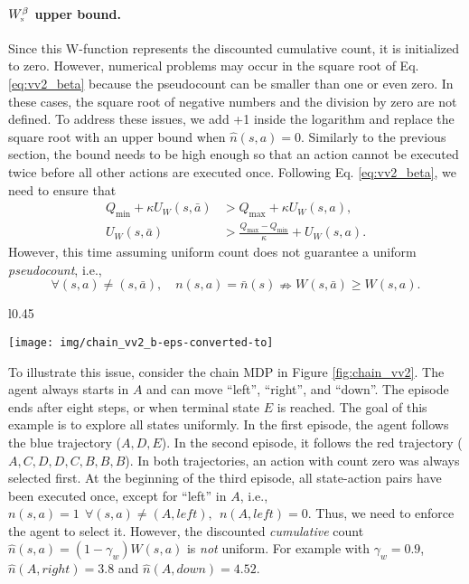 \documentclass{article}
\newcommand{\textsub}[1]{\textsc{\tiny #1}} \newcommand{\func}[2]{\textsf{#1}(#2)} \newcommand{\hl}[1]{\textcolor{red}{{#1}}} \newcommand{\hll}[1]{\textcolor{blue}{{#1}}}
\newcommand{\coeff}{\kappa}
\begin{document}
\paragraph{$W^\beta_{\textsub{n}}$ upper bound.}
Since this W-function represents the discounted cumulative count, it is initialized to zero. 
However, numerical problems may occur in the square root of Eq. \eqref{eq:vv2_beta} because the pseudocount can be smaller than one or even zero. In these cases, the square root of negative numbers and the division by zero are not defined.
To address these issues, we add +1 inside the logarithm and replace the square root with an upper bound when $\hat{n}(s,a) = 0$. Similarly to the previous section, the bound needs to be high enough so that an action cannot be executed twice before all other actions are executed once. Following Eq. \eqref{eq:vv2_beta}, we need to ensure that 
\begin{align}
Q_{\min} + \coeff U_W(s,\bar{a}) &> Q_{\max} + \coeff U_W(s,a), \nonumber
\\
U_W(s,\bar{a}) &> \frac{Q_{\max} - Q_{\min}}{\coeff} + U_W(s,a). \label{eq:vv2_condition}
\end{align}
However, this time assuming uniform count does not guarantee a uniform \textit{pseudocount}, i.e., 
\begin{equation}
\forall (s,a) \neq (s,\bar{a}), \quad n(s,a) = \bar{n}(s) \nRightarrow W(s,\bar{a}) \geq W(s,a).
\end{equation}

\begin{wrapfigure}{l}{0.45\textwidth}
	\begin{center}
		\vspace*{-0.7cm}
		\texttt{[image: img/chain\_vv2\_b-eps-converted-to]}
	\end{center}
	\vspace*{-0.3cm}
	\caption{\label{fig:chain_vv2}Chainworld with uniform count.}
	\vspace*{-0.3cm}
\end{wrapfigure}
To illustrate this issue, consider the chain MDP in Figure \ref{fig:chain_vv2}. The agent always starts in $A$ and can move ``left'', ``right'', and ``down''. The episode ends after eight steps, or when terminal state $E$ is reached. The goal of this example is to explore all states uniformly.
In the first episode, the agent follows the blue trajectory ($A, D, E$). In the second episode, it follows the red trajectory ($A, C, D, D, C, B, B, B$). In both trajectories, an action with count zero was always selected first. At the beginning of the third episode, all state-action pairs have been executed once, except for ``left'' in $A$, i.e., $n(s,a)=1 \:\: \forall (s,a) \neq (A,left), \:\: n(A,left)=0$. Thus, we need to enforce the agent to select it. 
However, the discounted \textit{cumulative} count $\hat n(s,a) = (1 - \gamma_w) W(s,a)$ is \textit{not} uniform. For example with $\gamma_w = 0.9$, $\hat n(A,right) = 3.8$ and $\hat n(A,down) = 4.52$.
\end{document}
